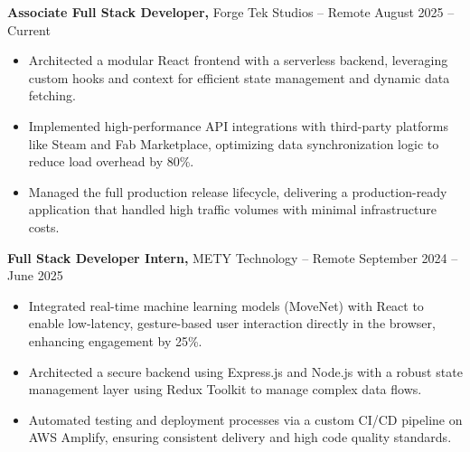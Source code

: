 \documentclass[11pt]{article}       %
\begin{document}
\textbf{Associate Full Stack Developer,} {Forge Tek Studios} -- Remote \hfill August 2025 -- Current 
\vspace{-9pt}
\begin{itemize}
  \item Architected a modular React frontend with a serverless backend, leveraging custom hooks and context for efficient state management and dynamic data fetching.
  \item Implemented high-performance API integrations with third-party platforms like Steam and Fab Marketplace, optimizing data synchronization logic to reduce load overhead by 80\%.
  \item Managed the full production release lifecycle, delivering a production-ready application that handled high traffic volumes with minimal infrastructure costs.
\end{itemize}

\textbf{Full Stack Developer Intern,} {METY Technology} -- Remote \hfill September 2024 -- June 2025 
\vspace{-9pt}
\begin{itemize}
  \item Integrated real-time machine learning models (MoveNet) with React to enable low-latency, gesture-based user interaction directly in the browser, enhancing engagement by 25\%.
  \item Architected a secure backend using Express.js and Node.js with a robust state management layer using Redux Toolkit to manage complex data flows.
  \item Automated testing and deployment processes via a custom CI/CD pipeline on AWS Amplify, ensuring consistent delivery and high code quality standards.
\end{itemize}

\end{document}
